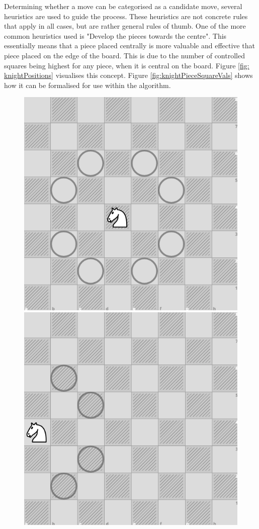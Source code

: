 Determining whether a move can be categorised as a candidate move, several heuristics are used to guide the process. These heuristics are not concrete rules that apply in all cases, but are rather general rules of thumb. One of the more common heuristics used is "Develop the pieces towards the centre". This essentially means that a piece placed centrally is more valuable and effective that piece placed on the edge of the board. This is due to the number of controlled squares being highest for any piece, when it is central on the board. Figure \ref{fig: knightPositions} visualises this concept. Figure \ref{fig:knightPieceSquareVals} shows how it can be formalised for use within the algorithm.
\begin{figure}[H]
    \centering
    \includegraphics[scale=0.25]{images/centralKnight.png}
    \includegraphics[scale=0.25]{images/rimKnight.png}

\end{figure}
